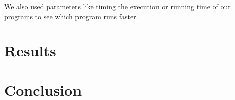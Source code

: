 \documentclass[12pt,a4paper,IEEEtran]{article}
\begin{document}
We also used parameters like timing the execution or running time of our programs to see which program runs faster. 

\section{Results}


\section{Conclusion}



\end{document}
